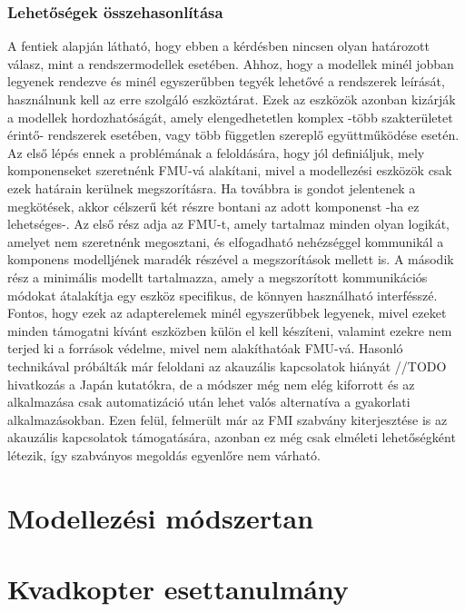         \subsubsection{Lehetőségek összehasonlítása}
            A fentiek alapján látható, hogy ebben a kérdésben nincsen olyan határozott válasz, mint a rendszermodellek esetében.
            Ahhoz, hogy a modellek minél jobban legyenek rendezve és minél egyszerűbben tegyék lehetővé a rendszerek leírását, használnunk kell az erre szolgáló eszköztárat.
            Ezek az eszközök azonban kizárják a modellek hordozhatóságát, amely elengedhetetlen komplex -több szakterületet érintő- rendszerek esetében, vagy több független szereplő együttműködése esetén.
            Az első lépés ennek a problémának a feloldására, hogy jól definiáljuk, mely komponenseket szeretnénk FMU-vá alakítani, mivel a modellezési eszközök csak ezek határain kerülnek megszorításra.
            Ha továbbra is gondot jelentenek a megkötések, akkor célszerű két részre bontani az adott komponenst -ha ez lehetséges-.
            Az első rész adja az FMU-t, amely tartalmaz minden olyan logikát, amelyet nem szeretnénk megosztani, és elfogadható nehézséggel kommunikál a komponens modelljének maradék részével a megszorítások mellett is.
            A második rész a minimális modellt tartalmazza, amely a megszorított kommunikációs módokat átalakítja egy eszköz specifikus, de könnyen használható interfésszé.
            Fontos, hogy ezek az adapterelemek minél egyszerűbbek legyenek, mivel ezeket minden támogatni kívánt eszközben külön el kell készíteni, valamint ezekre nem terjed ki a források védelme, mivel nem alakíthatóak FMU-vá.
            Hasonló technikával próbálták már feloldani az akauzális kapcsolatok hiányát //TODO hivatkozás a Japán kutatókra, de a módszer még nem elég kiforrott és az alkalmazása csak automatizáció után lehet valós alternatíva a gyakorlati alkalmazásokban.
            Ezen felül, felmerült már az FMI szabvány kiterjesztése is az akauzális kapcsolatok támogatására, azonban ez még csak elméleti lehetőségként létezik, így szabványos megoldás egyenlőre nem várható.

\section{Modellezési módszertan}

\section{Kvadkopter esettanulmány}
